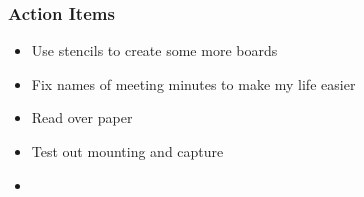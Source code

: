 		\subsubsection*{Action Items}
			\begin{itemize}
				\item Use stencils to create some more boards
				\item Fix names of meeting minutes to make my life easier
				\item Read over paper 
				\item Test out mounting and capture
				\item 
			\end{itemize}


